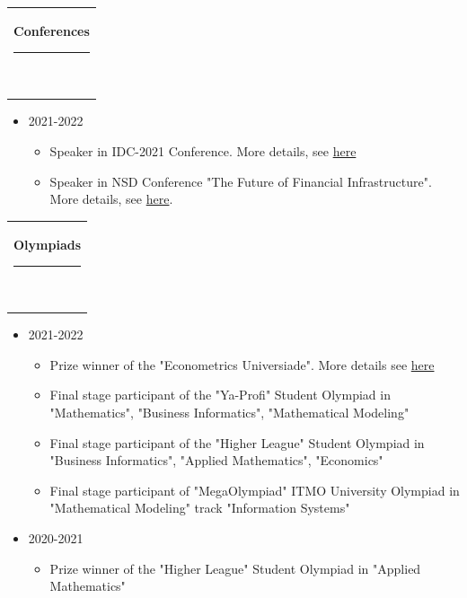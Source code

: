 \documentclass[10pt,A4,english]{article}
\newcommand{\mpwidth}{\linewidth-\fboxsep-\fboxsep}
\newcommand{\cvtext}[1] {
	\begin{tabular*}{1\mpwidth}{p{0.98\mpwidth}}
		\parbox{1\mpwidth}{#1}
	\end{tabular*}
}
\newcommand{\cvsection}[1] {
	\vspace{14pt}
	\cvtext{
		\textbf{\LARGE{\textcolor{darkcol}{#1}}}\\[-4pt]
		\textcolor{accentcol}{ \rule{0.2\textwidth}{1.5pt} } \\
	}
}
\begin{document}
\begin{paracol}{2}
\begin{rightcolumn}
	\vfill\null


\vspace{-0.3cm}

\cvsection{Conferences}
\begin{itemize}
    \item 2021-2022
    \begin{itemize}
        \item Speaker in IDC-2021 Conference. More details, see \href{https://spb.hse.ru/en/idc/#about}{here}
        
    \item Speaker in NSD Conference "The Future of Financial Infrastructure"{}. More details, see \href{https://github.com/myupeshkov/NSD_MOEX/tree/main/conference_2021}{here}.
    \end{itemize}
    
\end{itemize}

\vspace{-0.3cm}

\cvsection{Olympiads}

\vspace{-0.35cm}
\begin{itemize}
\item 2021-2022
\vspace{-0.1cm}
\begin{itemize}

    \item Prize winner of the "Econometrics Universiade"{}. More details see \href{https://new.universiade-ecm.com/results/}{here}
    \item Final stage participant of the "Ya-Profi"{} Student Olympiad in "Mathematics"{}, "Business Informatics"{}, "Mathematical Modeling"{}
    \item Final stage participant of the "Higher League"{} Student Olympiad in "Business Informatics"{}, "Applied Mathematics"{}, "Economics"{}
    \item Final stage participant of "MegaOlympiad"{}  ITMO University Olympiad in "Mathematical Modeling"{} track "Information Systems"{}
    
\end{itemize}

\item 2020-2021 
\vspace{-0.2cm}
\begin{itemize}
    
  \item Prize winner of the "Higher League"{} Student Olympiad in "Applied Mathematics"{}


\end{itemize}
\end{itemize}
\end{rightcolumn}
\end{paracol}
\end{document}
